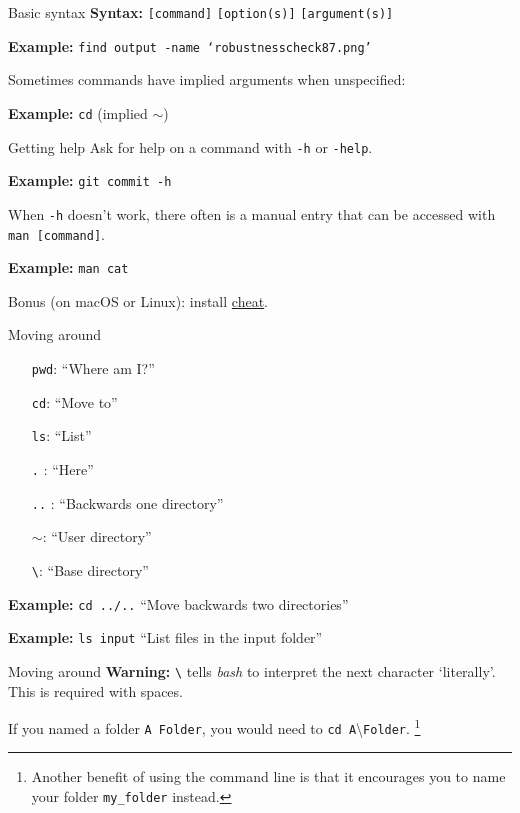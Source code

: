 \begin{frame}{Basic syntax}
    \stretchon
    \textbf{Syntax:} \texttt{[command]} \texttt{[option(s)]} \texttt{[argument(s)]}

    \textbf{Example:} \texttt{find output -name `robustnesscheck87.png'}

    Sometimes commands have implied arguments when unspecified:

    \textbf{Example:} \texttt{cd} (implied $\sim$)
\end{frame}

\begin{frame}{Getting help}
    \stretchon
    Ask for help on a command with \texttt{-h} or \texttt{-help}.

    \textbf{Example:} \texttt{git commit -h}

    When \texttt{-h} doesn't work, there often is a manual entry that can be
    accessed with \texttt{man [command]}.

    \textbf{Example:} \texttt{man cat}

    Bonus (on macOS or Linux): install \href{https://github.com/chrisallenlane/cheat}{cheat}.
\end{frame}

\begin{frame}{Moving around}
    \stretchon
    \begin{itemize}
        \item[\texttt{pwd}:] ``Where am I?''
        \item[\texttt{cd}:] ``Move to''
        \item[\texttt{ls}:] ``List''
        \item[\texttt{.} :] ``Here''
        \item[\texttt{..} :] ``Backwards one directory''
        \item[\texttt{$\sim$}:] ``User directory''
        \item[\texttt{\textbackslash}:] ``Base directory''
    \end{itemize}

    \textbf{Example:} \texttt{cd ../..} ``Move backwards two directories''

    \textbf{Example:} \texttt{ls input} ``List files in the input folder''
\end{frame}

\begin{frame}{Moving around}
    \textbf{Warning:} \texttt{\textbackslash} tells \textit{bash} to interpret the next character
    `literally'.
    This is required with spaces.

    If you named a folder \texttt{A Folder}, you would need to \texttt{cd A}\textbackslash\hspace{0.1cm}\texttt{Folder}.
    \footnote{Another benefit of using the command line is that it encourages you to name your folder
    \texttt{my\_folder} instead.}
\end{frame}

